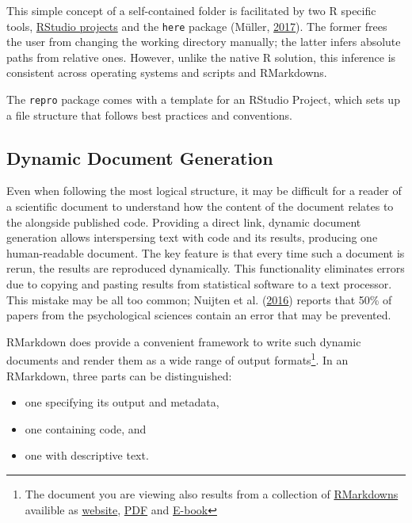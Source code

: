 \documentclass[12pt,a4paper,]{article}
\providecommand{\tightlist}{%
  \setlength{\itemsep}{0pt}\setlength{\parskip}{0pt}}
\begin{document}
This simple concept of a self-contained folder is facilitated by two R specific tools, \href{https://r4ds.had.co.nz/workflow-projects.html}{RStudio projects} and the \texttt{here} package (Müller, \protect\hyperlink{ref-R-here}{2017}).
The former frees the user from changing the working directory manually; the latter infers absolute paths from relative ones.
However, unlike the native R solution, this inference is consistent across operating systems and scripts and RMarkdowns.

The \texttt{repro} package comes with a template for an RStudio Project, which sets up a file structure that follows best practices and conventions.

\hypertarget{dynamic-document-generation}{%
\subsection{Dynamic Document Generation}\label{dynamic-document-generation}}

Even when following the most logical structure, it may be difficult for a reader of a scientific document to understand how the content of the document relates to the alongside published code.
Providing a direct link, dynamic document generation allows interspersing text with code and its results, producing one human-readable document.
The key feature is that every time such a document is rerun, the results are reproduced dynamically.
This functionality eliminates errors due to copying and pasting results from statistical software to a text processor. This mistake may be all too common; Nuijten et al. (\protect\hyperlink{ref-nuijtenPrevalenceStatisticalReporting2016}{2016}) reports that 50\% of papers from the psychological sciences contain an error that may be prevented.

RMarkdown does provide a convenient framework to write such dynamic documents and render them as a wide range of output formats\footnote{The document you are viewing also results from a collection of \href{https://github.com/aaronpeikert/repro-thesis}{RMarkdowns} availible as \href{https://aaronpeikert.github.io/repro-thesis/}{website}, \href{https://aaronpeikert.github.io/repro-thesis/ma.pdf}{PDF} and \href{https://aaronpeikert.github.io/repro-thesis/ma.epub}{E-book}}. In an RMarkdown, three parts can be distinguished:

\begin{itemize}
\tightlist
\item
  one specifying its output and metadata,
\item
  one containing code, and
\item
  one with descriptive text.
\end{itemize}
\end{document}
